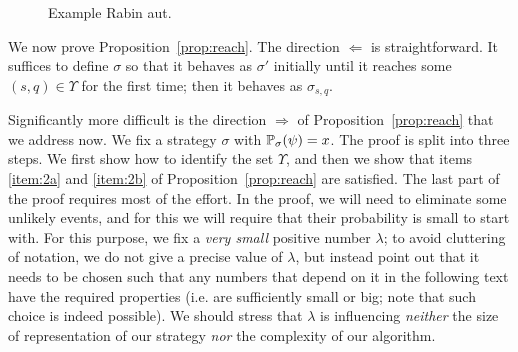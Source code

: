 \documentclass[a4paper,UKenglish]{lipics}
\newcommand{\true}{\mathsf{true}}
\renewcommand{\Pr}[3][]{\ifblank{#1}{\mathbb{P}_{#2}}{\mathbb{P}^{#1}_{#2}}(#3)}
\newcommand{\ap}[1]{\ensuremath{\mathsf{#1}}}
\begin{document}
\begin{wrapfigure}[10]{r}{0.35\textwidth}
	\caption{Example Rabin aut.\label{fig:rabin}}
\end{wrapfigure}

We now prove Proposition~\ref{prop:reach}. The direction $\Leftarrow$ is straightforward. It suffices to define $\sigma$ so that it behaves as $\sigma'$ initially until it reaches some $(s,q) \in \Upsilon$ for the first time; then it behaves as $\sigma_{s,q}$.

Significantly more difficult is the direction $\Rightarrow$ of Proposition~\ref{prop:reach} that we address now. We fix a strategy $\sigma$ with $\Pr{\sigma}{\psi}=x$.
The proof is split into three steps. We first show how to identify the set $\Upsilon$, and then we show that items \ref{item:2a} and \ref{item:2b} of Proposition~\ref{prop:reach} are satisfied. The last part of the proof requires most of the effort.
In the proof, we will need to eliminate some unlikely events, and for this we will require that their probability is small to start with.
For this purpose, we fix a {\em very small} positive number \label{page:lambda}$\lambda$; to avoid cluttering of notation, we do not give
a precise value of $\lambda$, but instead point out that it needs to be chosen such that any numbers that depend on
it in the following text have the required properties (i.e. are sufficiently small or big; note that such choice is indeed possible). 
We should stress that $\lambda$ is influencing \emph{neither} the size of representation of our strategy \emph{nor} the complexity of our algorithm.
\end{document}
